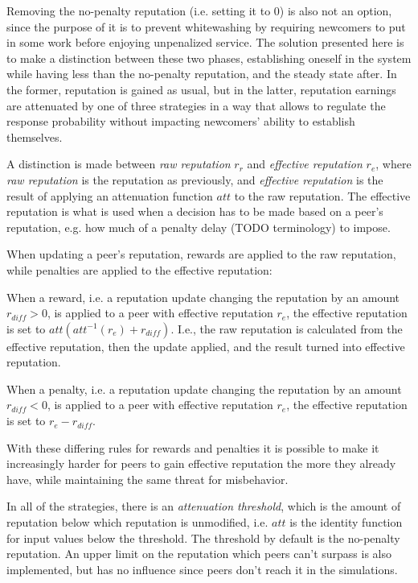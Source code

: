 Removing the no-penalty reputation (i.e. setting it to 0) is also not an option,
since the purpose of it is to prevent whitewashing by requiring newcomers to put
in some work before enjoying unpenalized service. The solution presented here is
to make a distinction between these two phases, establishing oneself in the
system while having less than the no-penalty reputation, and the steady state
after. In the former, reputation is gained as usual, but in the latter,
reputation earnings are attenuated by one of three strategies in a way that
allows to regulate the response probability without impacting newcomers' ability
to establish themselves.

A distinction is made between \emph{raw reputation} $r_r$ and \emph{effective
reputation} $r_e$, where \emph{raw reputation} is the reputation as previously,
and \emph{effective reputation} is the result of applying an attenuation
function $att$ to the raw reputation. The effective reputation is what is used
when a decision has to be made based on a peer's reputation, e.g.  how much of a
penalty delay (TODO terminology) to impose.

When updating a peer's reputation, rewards are applied to the raw reputation,
while penalties are applied to the effective reputation:

When a reward, i.e. a reputation update changing the reputation by an amount
$r_{diff} > 0$, is applied to a peer with effective reputation $r_e$, the
effective reputation is set to $att(att^{-1}(r_e) + r_{diff})$. I.e., the raw
reputation is calculated from the effective reputation, then the update applied,
and the result turned into effective reputation.

When a penalty, i.e. a reputation update changing the reputation by an amount
$r_{diff} < 0$, is applied to a peer with effective reputation $r_e$, the
effective reputation is set to $r_e - r_{diff}$.

With these differing rules for rewards and penalties it is possible to make it
increasingly harder for peers to gain effective reputation the more they already
have, while maintaining the same threat for misbehavior.

In all of the strategies, there is an \emph{attenuation threshold}, which is the
amount of reputation below which reputation is unmodified, i.e. $att$ is the
identity function for input values below the threshold. The threshold by default
is the no-penalty reputation. An upper limit on the reputation which peers can't
surpass is also implemented, but has no influence since peers don't reach it in
the simulations.


